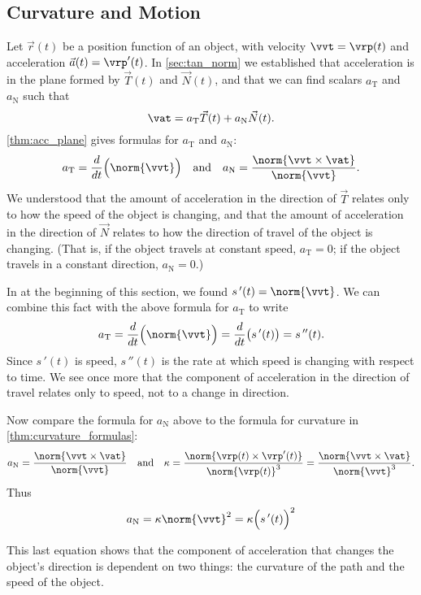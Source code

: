\subsection{Curvature and Motion}

Let $\vec r(t)$ be a position function of an object, with velocity $\vvt = \vrp(t)$ and acceleration $\vec a(t)=\vrp'(t)$. In \autoref{sec:tan_norm} we established that acceleration is in the plane formed by $\vec T(t)$ and $\vec N(t)$, and that we can find scalars $a_\text{T}$ and $a_\text{N}$ such that 
\[\vat = a_\text{T}\vec T(t) + a_\text{N}\vec N(t).\]
\autoref{thm:acc_plane} gives formulas for $a_\text{T}$ and $a_\text{N}$:
\[a_\text{T} = \frac{d}{dt}\Bigl(\norm{\vvt}\Bigr) \quad \text{and} \quad a_\text{N} = \frac{\norm{\vvt\times \vat}}{\norm{\vvt}}.\]
We understood that the amount of acceleration in the direction of $\vec T$ relates only to how the speed of the object is changing, and that the amount of acceleration in the direction of $\vec N$ relates to how the direction of travel of the object is changing. (That is, if the object travels at constant speed, $a_\text{T}=0$; if the object travels in a constant direction, $a_\text{N}=0$.)


In  at the beginning of this section, we found
$s\,'(t) = \norm{\vvt}$. We can combine this fact with the above formula for $a_\text{T}$ to write
\[a_\text{T} = \frac{d}{dt}\Bigl(\norm{\vvt}\Bigr) = \frac{d}{dt}\bigl( s\,'(t)\bigr) = s\,''(t).\]
Since $s\,'(t)$ is speed, $s\,''(t)$ is the rate at which speed is changing with respect to time. We see once more that the component of acceleration in the direction of travel relates only to speed, not to a change in direction.

Now compare the formula for $a_\text{N}$ above to the formula for curvature in \autoref{thm:curvature_formulas}:
\[a_\text{N} = \frac{\norm{\vvt\times \vat}}{\norm{\vvt}}\quad \text{and}\quad \kappa = \frac{\norm{\vrp(t)\times\vrp'(t)}}{\norm{\vrp(t)}^3}=\frac{\norm{\vvt\times \vat}}{\norm{\vvt}^3} .\]
Thus 
\begin{equation}\label{eq:curvature_an}
a_\text{N} = \kappa \norm{\vvt}^2 = \kappa\Bigl(s\,'(t)\Bigr)^2
\end{equation}

This last equation shows that the component of acceleration that changes the object's direction is dependent on two things: the curvature of the path and the speed of the object.

